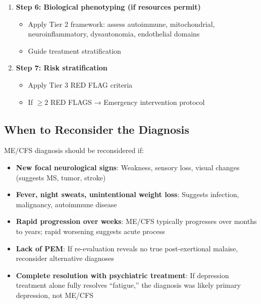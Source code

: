 \begin{observation}
\begin{enumerate}
    \item \textbf{Step 6: Biological phenotyping (if resources permit)}
    \begin{itemize}
        \item Apply Tier 2 framework: assess autoimmune, mitochondrial, neuroinflammatory, dysautonomia, endothelial domains
        \item Guide treatment stratification
    \end{itemize}

    \item \textbf{Step 7: Risk stratification}
    \begin{itemize}
        \item Apply Tier 3 RED FLAG criteria
        \item If $\geq 2$ RED FLAGS → Emergency intervention protocol
    \end{itemize}
\end{enumerate}
\end{observation}

\subsection{When to Reconsider the Diagnosis}

\begin{warning}
\label{warn:reconsider-diagnosis}
ME/CFS diagnosis should be reconsidered if:
\begin{itemize}
    \item \textbf{New focal neurological signs}: Weakness, sensory loss, visual changes (suggests MS, tumor, stroke)
    \item \textbf{Fever, night sweats, unintentional weight loss}: Suggests infection, malignancy, autoimmune disease
    \item \textbf{Rapid progression over weeks}: ME/CFS typically progresses over months to years; rapid worsening suggests acute process
    \item \textbf{Lack of PEM}: If re-evaluation reveals no true post-exertional malaise, reconsider alternative diagnoses
    \item \textbf{Complete resolution with psychiatric treatment}: If depression treatment alone fully resolves ``fatigue,'' the diagnosis was likely primary depression, not ME/CFS
\end{itemize}
\end{warning}

